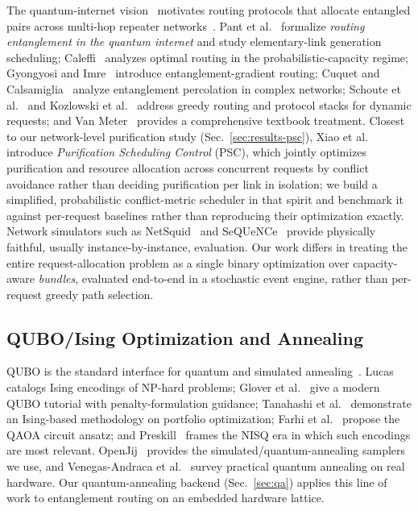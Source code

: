 \documentclass[twocolumn]{article}
\begin{document}
The quantum-internet vision~\cite{kimble2008quantum,wehner2018quantum,
simon2017towards} motivates routing protocols that allocate
entangled pairs across multi-hop repeater
networks~\cite{briegel1998quantum,dur1999entanglement,
sangouard2011quantum,azuma2023quantum}.  Pant et
al.~\cite{pant2022routing} formalize \emph{routing entanglement in the
quantum internet} and study elementary-link generation scheduling;
Caleffi~\cite{caleffi2017optimal} analyzes optimal routing in the
probabilistic-capacity regime; Gyongyosi and
Imre~\cite{gyongyosi2019entanglement} introduce entanglement-gradient
routing; Cuquet and Calsamiglia~\cite{cuquet2009entanglement} analyze
entanglement percolation in complex networks; Schoute et
al.~\cite{schoute2016shortcuts} and Kozlowski et
al.~\cite{kozlowski2020designing} address greedy routing and protocol
stacks for dynamic requests; and Van Meter~\cite{vanmeter2014quantum}
provides a comprehensive textbook treatment.  Closest to our
network-level purification study (Sec.~\ref{sec:results-psc}), Xiao et
al.~\cite{xiao2024purification} introduce \emph{Purification
Scheduling Control} (PSC), which jointly optimizes purification and
resource allocation across concurrent requests by conflict avoidance
rather than deciding purification per link in isolation; we build a
simplified, probabilistic conflict-metric scheduler in that spirit and
benchmark it against per-request baselines rather than reproducing
their optimization exactly.  Network simulators such as
NetSquid~\cite{coopmans2021netsquid} and
SeQUeNCe~\cite{wu2021sequence} provide physically faithful, usually
instance-by-instance, evaluation.  Our work differs in treating the
entire request-allocation problem as a single binary optimization over
capacity-aware \emph{bundles}, evaluated end-to-end in a stochastic
event engine, rather than per-request greedy path selection.

\subsection{QUBO/Ising Optimization and Annealing}
\label{sec:related-qubo}

QUBO is the standard interface for quantum and simulated
annealing~\cite{kadowaki1998quantum,kirkpatrick1983optimization,
johnson2011quantum,boixo2014evidence}.  Lucas~\cite{lucas2014ising}
catalogs Ising encodings of NP-hard problems; Glover et
al.~\cite{glover2019tutorial} give a modern QUBO tutorial with
penalty-formulation guidance; Tanahashi et al.~\cite{tanahashi2019application}
demonstrate an Ising-based methodology on portfolio optimization;
Farhi et al.~\cite{farhi2014qaoa} propose the QAOA circuit ansatz;
and Preskill~\cite{preskill2018nisq} frames the NISQ era in which such
encodings are most relevant.  OpenJij~\cite{openjij} provides the
simulated/quantum-annealing samplers we use, and
Venegas-Andraca et al.~\cite{venegas2018quantum} survey practical
quantum annealing on real hardware.  Our quantum-annealing backend
(Sec.~\ref{sec:qa}) applies this line of work to entanglement routing
on an embedded hardware lattice.
\end{document}
